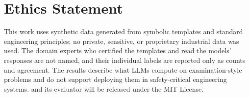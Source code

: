 \section*{Ethics Statement}
\label{sec:ethics}

This work uses synthetic data generated from symbolic templates and standard engineering principles;
no private, sensitive, or proprietary industrial data was used.
The domain experts who certified the templates and read the models' responses are not named, and
their individual labels are reported only as counts and agreement.
The results describe what LLMs compute on examination-style problems and do not support deploying
them in safety-critical engineering systems.
\ourdataset and its evaluator will be released under the MIT License.
